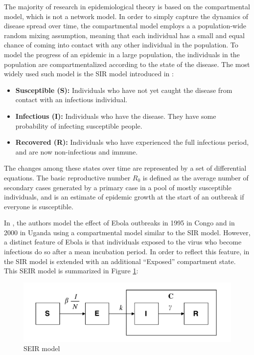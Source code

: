 \documentclass[10pt, journal,onecolumn]{IEEEtran}
\begin{document}
\label{SubSec:SIR}

The majority of research in epidemiological theory is based on the compartmental model,
which is not a network model.
In order to simply capture the dynamics of disease spread over time, the compartmental model
employs a a population-wide random mixing assumption, meaning that each individual has a
small and equal chance of coming into contact with any other individual in the population. 
To model the progress of an epidemic in a large population, the
individuals in the population are compartmentalized according to the state of the disease. The most
widely used such model is the SIR model introduced in \citep{very_old_paper}:

\begin{itemize}
\item \textbf{Susceptible (S):} Individuals who have not yet caught the disease from contact with an infectious
  individual.
\item \textbf{Infectious (I):} Individuals who have the disease. They have some probability of
  infecting susceptible people.
\item \textbf{Recovered (R):} Individuals who have experienced the full infectious period, and are
  now non-infectious and immune.
\end{itemize}

The changes among these states over time are represented by a set of differential equations.
The basic reproductive number $R_0$
is defined as the average number of secondary cases generated by a primary case in a pool of mostly
susceptible individuals, and is an estimate of epidemic growth at the start of an outbreak if
everyone is susceptible.

\label{SubSec:SEIR}

In \citep{chowell2004basic}, the authors model the effect of Ebola outbreaks in 1995 in Congo and in
2000 in Uganda using a compartmental model similar to the SIR model. However,
a distinct feature of Ebola is that individuals exposed to the virus who become infectious do so
after a mean incubation period. In order to reflect this feature, in the SIR model is extended with
an additional ``Exposed'' compartment state. This SEIR model is summarized in
Figure \ref{fig:SEIR_model}:

\begin{figure}[h!]
\captionsetup{justification=centering}
\includegraphics[scale=0.4]{seir_model_fig}
\centering\caption{SEIR model}
\label{fig:SEIR_model}
\end{figure}
\end{document}
